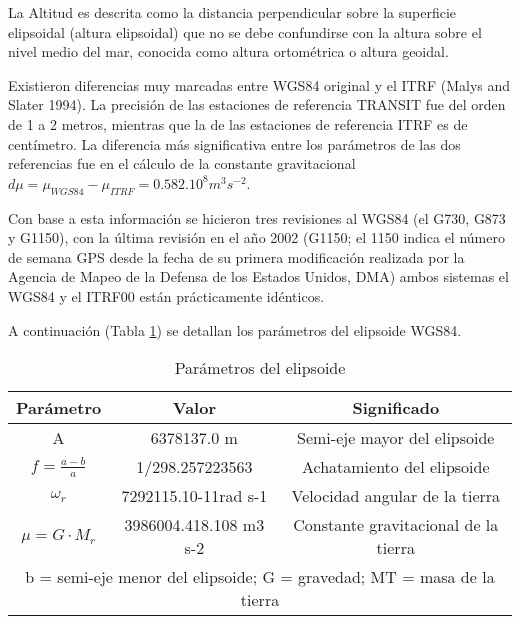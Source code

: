 La Altitud es descrita como la distancia perpendicular sobre la superficie elipsoidal (altura elipsoidal) que no se debe confundirse con la altura sobre el nivel medio del mar, conocida como altura ortométrica o altura geoidal.

Existieron diferencias muy marcadas entre WGS84 original y el ITRF (Malys and Slater 1994). La precisión de las estaciones de referencia TRANSIT fue del orden de 1 a 2 metros, mientras que la de las estaciones de referencia ITRF es de centímetro. La diferencia más significativa entre los parámetros de las dos referencias fue en el cálculo de la constante gravitacional $d\mu=\mu_{WGS84}-\mu_{ITRF}=0.582.10^8m^3s^{-2}$.

Con base a esta información se hicieron tres revisiones  al WGS84 (el G730, G873 y G1150), con la última revisión en el año 2002 (G1150; el 1150 indica el número de semana GPS desde la fecha de su primera modificación realizada por la Agencia de Mapeo de la Defensa de los Estados Unidos, DMA) ambos sistemas el WGS84 y el ITRF00 están prácticamente idénticos. 

A continuación (Tabla \ref{tabsig3}) se detallan los parámetros del elipsoide WGS84.
\begin{table}[h!]
  \centering
  \begin{tabular}{@{}ccc@{}}
  \toprule
  Parámetro               & Valor                    & Significado                           \\ \midrule
  A                       & 6378137.0 m              & Semi-eje mayor del elipsoide          \\
  $f = \frac{a - b}{a}$   & 1/298.257223563          & Achatamiento del elipsoide            \\
  $\omega_r$              & 7292115.10-11rad s-1     & Velocidad angular de la tierra        \\
  $\mu = G\cdot M_r$      & 3986004.418.108 m3 s-2   & Constante gravitacional de la tierra  \\
  \multicolumn{3}{c}{b = semi-eje menor del elipsoide; G = gravedad; MT = masa de la tierra} \\ \bottomrule
  \end{tabular}
  \caption{Parámetros del elipsoide}
  \label{tabsig3}
  \end{table}

